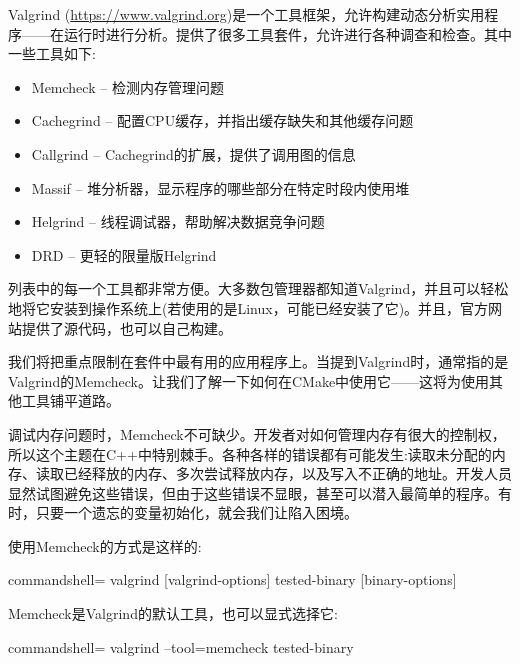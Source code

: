 
Valgrind (\url{https://www.valgrind.org})是一个工具框架，允许构建动态分析实用程序——在运行时进行分析。提供了很多工具套件，允许进行各种调查和检查。其中一些工具如下:

\begin{itemize}
\item 
Memcheck – 检测内存管理问题

\item 
Cachegrind – 配置CPU缓存，并指出缓存缺失和其他缓存问题

\item 
Callgrind – Cachegrind的扩展，提供了调用图的信息

\item 
Massif – 堆分析器，显示程序的哪些部分在特定时段内使用堆

\item 
Helgrind – 线程调试器，帮助解决数据竞争问题

\item 
DRD – 更轻的限量版Helgrind
\end{itemize}

列表中的每一个工具都非常方便。大多数包管理器都知道Valgrind，并且可以轻松地将它安装到操作系统上(若使用的是Linux，可能已经安装了它)。并且，官方网站提供了源代码，也可以自己构建。

我们将把重点限制在套件中最有用的应用程序上。当提到Valgrind时，通常指的是Valgrind的Memcheck。让我们了解一下如何在CMake中使用它——这将为使用其他工具铺平道路。


调试内存问题时，Memcheck不可缺少。开发者对如何管理内存有很大的控制权，所以这个主题在C++中特别棘手。各种各样的错误都有可能发生:读取未分配的内存、读取已经释放的内存、多次尝试释放内存，以及写入不正确的地址。开发人员显然试图避免这些错误，但由于这些错误不显眼，甚至可以潜入最简单的程序。有时，只要一个遗忘的变量初始化，就会我们让陷入困境。

使用Memcheck的方式是这样的:

\begin{tcblisting}{commandshell={}}
valgrind [valgrind-options] tested-binary [binary-options]
\end{tcblisting}

Memcheck是Valgrind的默认工具，也可以显式选择它:

\begin{tcblisting}{commandshell={}}
valgrind --tool=memcheck tested-binary
\end{tcblisting}

